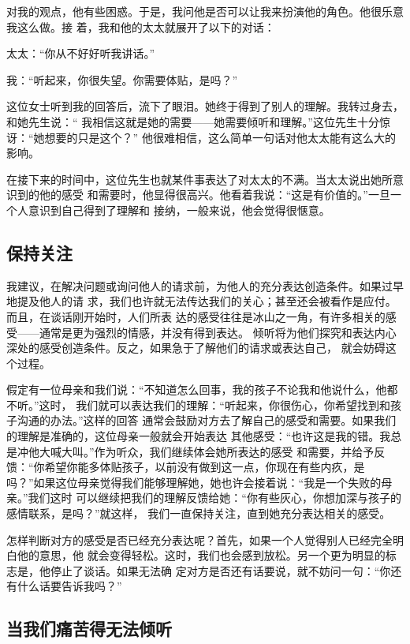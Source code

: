 \documentclass{ctexart}
\renewenvironment{quotation}{\setlength{\parskip}{0.5em}\setstretch{1.5}\kaishu\zihao{-5}\setlength{\parindent}{1em}}{\vspace{1em}}
\begin{document}
对我的观点，他有些困惑。于是，我问他是否可以让我来扮演他的角色。他很乐意我这么做。接
着，我和他的太太就展开了以下的对话：

\begin{quotation}
	太太：``你从不好好听我讲话。''

	我：``听起来，你很失望。你需要体贴，是吗？''
\end{quotation}

这位女士听到我的回答后，流下了眼泪。她终于得到了别人的理解。我转过身去，和她先生说：``
我相信这就是她的需要------她需要倾听和理解。''这位先生十分惊讶：``她想要的只是这个？''
他很难相信，这么简单一句话对他太太能有这么大的影响。

在接下来的时间中，这位先生也就某件事表达了对太太的不满。当太太说出她所意识到的他的感受
和需要时，他显得很高兴。他看着我说：``这是有价值的。''一旦一个人意识到自己得到了理解和
接纳，一般来说，他会觉得很惬意。


\subsection{保持关注}

我建议，在解决问题或询问他人的请求前，为他人的充分表达创造条件。如果过早地提及他人的请
求，我们也许就无法传达我们的关心；甚至还会被看作是应付。而且，在谈话刚开始时，人们所表
达的感受往往是冰山之一角，有许多相关的感受------通常是更为强烈的情感，并没有得到表达。
倾听将为他们探究和表达内心深处的感受创造条件。反之，如果急于了解他们的请求或表达自己，
就会妨碍这个过程。

假定有一位母亲和我们说：``不知道怎么回事，我的孩子不论我和他说什么，他都不听。''这时，
我们就可以表达我们的理解：``听起来，你很伤心，你希望找到和孩子沟通的办法。''这样的回答
通常会鼓励对方去了解自己的感受和需要。如果我们的理解是准确的，这位母亲一般就会开始表达
其他感受：``也许这是我的错。我总是冲他大喊大叫。''作为听众，我们继续体会她所表达的感受
和需要，并给予反馈：``你希望你能多体贴孩子，以前没有做到这一点，你现在有些内疚，是
吗？''如果这位母亲觉得我们能够理解她，她也许会接着说：``我是一个失败的母亲。''我们这时
可以继续把我们的理解反馈给她：``你有些灰心，你想加深与孩子的感情联系，是吗？''就这样，
我们一直保持关注，直到她充分表达相关的感受。

怎样判断对方的感受是否已经充分表达呢？首先，如果一个人觉得别人已经完全明白他的意思，他
就会变得轻松。这时，我们也会感到放松。另一个更为明显的标志是，他停止了谈话。如果无法确
定对方是否还有话要说，就不妨问一句：``你还有什么话要告诉我吗？''


\subsection{当我们痛苦得无法倾听}
\end{document}
